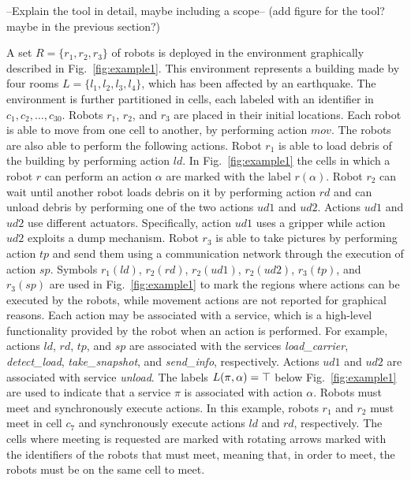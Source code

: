 --Explain the tool in detail, maybe including a scope-- (add figure for the tool? maybe in the previous section?)


A set $R=\{r_1, r_2, r_3 \}$ of robots  is deployed in the environment graphically described in  Fig.~\ref{fig:example1}.
This environment represents a building made by four rooms $L=\{ l_1, l_2, l_3, l_4 \}$, which has been affected by an earthquake.
The environment is further partitioned in cells, each labeled with an identifier in $c_1, c_2, \ldots, c_{30}$.
Robots $r_1$, $r_2$, and $r_3$ are placed in their initial locations.
Each robot is able to move from one cell to another, by performing action $mov$.
The robots are also able to perform the following actions.
Robot $r_1$ is able to load debris of the building by performing action $ld$. 
In Fig.~\ref{fig:example1} the cells in which a robot $r$ can perform an action $\alpha$ are marked with the label $r(\alpha)$.
Robot $r_2$ can wait until another robot loads debris on it by performing action $rd$ and can unload debris by performing one of the two actions $ud1$ and $ud2$. 
Actions $ud1$ and $ud2$ use different actuators.
Specifically, action $ud1$ uses a gripper while action $ud2$ exploits a dump mechanism.
Robot $r_3$ is able to take pictures by performing action $tp$ and send them using a communication network through the execution of action $sp$. 
Symbols $r_1(ld)$, $r_2(rd)$, $r_2(ud1)$, $r_2(ud2)$, $r_3(tp)$, and $r_3(sp)$ are used in Fig.~\ref{fig:example1} to mark the regions where  actions can be executed by the robots, while movement actions are not reported for graphical reasons.
Each action may be associated with a service, which is a high-level functionality provided by the robot when an action is performed.
For example, actions $ld$, $rd$, $tp$, and $sp$  are associated with the services \emph{load\_carrier}, \emph{detect\_load}, \emph{take\_snapshot}, and \emph{send\_info}, respectively.
Actions $ud1$ and $ud2$ are associated with service \emph{unload}.
The labels $L(\pi,\alpha)=\top$ below Fig.~\ref{fig:example1} are used to indicate that a service $\pi$ is associated with  action $\alpha$. 
Robots must meet and  synchronously execute actions. 
In this example, robots $r_1$ and  $r_2$ must meet  in cell $c_7$ and synchronously execute actions $ld$ and $rd$, respectively. 
The cells where meeting is requested are marked with rotating arrows marked with the identifiers of the robots that must meet, meaning that, in order to meet, the robots must be on the same cell to meet.


